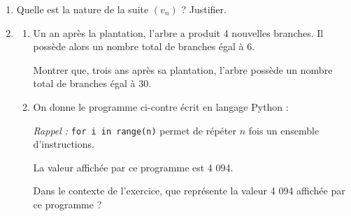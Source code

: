 \documentclass[10pt]{article}
\begin{document}
\begin{enumerate}
\item Quelle est la nature de la suite $(v_n)$ ? Justifier.
\item \begin{enumerate}
\item Un an après la plantation, l'arbre a produit 4 nouvelles branches. Il possède alors un nombre total de branches égal à 6.

Montrer que, trois ans après sa plantation, l'arbre possède un nombre total de branches égal à 30.
\item On donne le programme ci-contre écrit en langage Python :

\begin{minipage}[t]{0.48\linewidth}
\emph{Rappel :} \texttt{for i in range(n)} permet de répéter $n$ fois un ensemble d'instructions.
\end{minipage}\hfill
\begin{minipage}[t]{0.42\linewidth}
\end{minipage}

La valeur affichée par ce programme est 4 094.

Dans le contexte de l'exercice, que représente la valeur 4 094 affichée par ce programme ?
\end{enumerate}
\end{enumerate}

\clearpage
\end{document}
